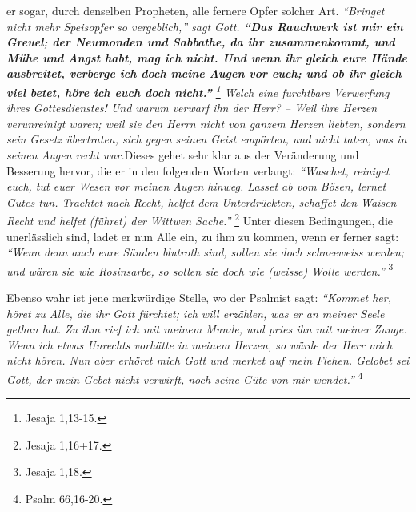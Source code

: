 er sogar, durch denselben Propheten, alle fernere Opfer solcher Art.
\textit{\textit{"`Bringet nicht mehr Speisopfer so vergeblich,"'} sagt Gott.
\textbf{"`Das Rauchwerk ist mir ein Greuel; der Neumonden und Sabbathe, da ihr
zusammenkommt, und Mühe und Angst habt, mag ich nicht. Und wenn ihr gleich eure
Hände ausbreitet, verberge ich doch meine Augen vor euch; und ob ihr gleich viel
betet, höre ich euch doch nicht."'} 
\footnote{Jesaja 1,13-15.}
Welch eine
furchtbare Verwerfung ihres Gottesdienstes! Und warum verwarf ihn der Herr? --
Weil ihre Herzen verunreinigt waren; weil sie den Herrn nicht von ganzem Herzen
liebten, sondern sein Gesetz übertraten, sich gegen seinen Geist empörten, und
nicht taten, was in seinen Augen recht war.}Dieses gehet sehr klar aus der
Veränderung und Besserung hervor, die er in den folgenden Worten verlangt:
\textit{"`Waschet, reiniget euch, tut euer Wesen vor meinen Augen hinweg. Lasset
ab vom
Bösen, lernet Gutes tun. Trachtet nach Recht, helfet dem Unterdrückten,
schaffet den Waisen Recht und helfet (führet) der Wittwen Sache."'}
\footnote{Jesaja 1,16+17.}
Unter diesen Bedingungen, die unerlässlich sind, ladet er nun Alle ein,
zu ihm zu kommen, wenn er ferner sagt:
\textit{"`Wenn denn auch eure Sünden blutroth
sind, sollen sie doch schneeweiss werden; und wären sie wie Rosinsarbe, so
sollen sie doch wie (weisse) Wolle werden."'}
\footnote{Jesaja 1,18.}

\medskip

Ebenso wahr ist jene merkwürdige Stelle, wo der Psalmist sagt:
\textit{"`Kommet her,
höret zu Alle, die ihr Gott fürchtet; ich will erzählen, was er an meiner Seele
gethan hat. Zu ihm rief ich mit meinem Munde, und pries ihn mit meiner Zunge.
Wenn ich etwas Unrechts vorhätte in meinem Herzen, so würde der Herr mich nicht
hören. Nun aber erhöret mich Gott und merket auf mein Flehen. Gelobet sei Gott,
der mein Gebet nicht verwirft, noch seine Güte von mir wendet."'}
\footnote{Psalm 66,16-20.}

